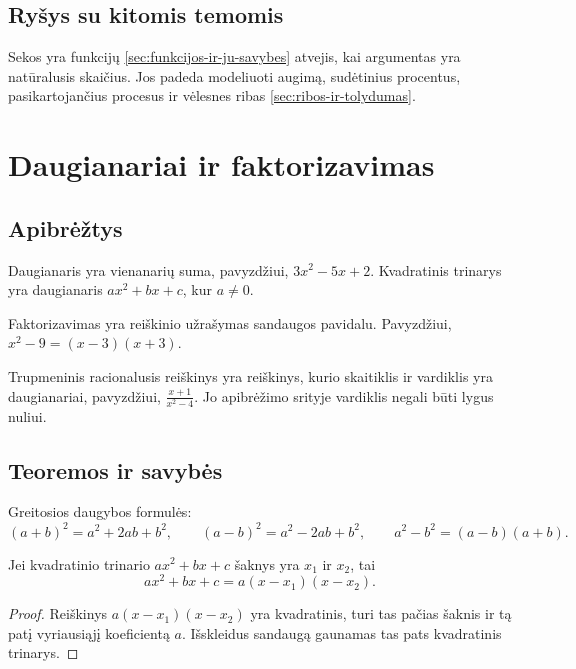\subsection{Ryšys su kitomis temomis}

Sekos yra funkcijų \ref{sec:funkcijos-ir-ju-savybes} atvejis, kai argumentas yra natūralusis skaičius. Jos padeda modeliuoti augimą, sudėtinius procentus, pasikartojančius procesus ir vėlesnes ribas \ref{sec:ribos-ir-tolydumas}.

\section{Daugianariai ir faktorizavimas}\label{sec:daugianariai-ir-faktorizavimas}

\subsection{Apibrėžtys}

\begin{apibreztis}
Daugianaris yra vienanarių suma, pavyzdžiui, $3x^2-5x+2$. Kvadratinis trinarys yra daugianaris $ax^2+bx+c$, kur $a\ne0$.
\end{apibreztis}

\begin{apibreztis}
Faktorizavimas yra reiškinio užrašymas sandaugos pavidalu. Pavyzdžiui, $x^2-9=(x-3)(x+3)$.
\end{apibreztis}

\begin{apibreztis}
Trupmeninis racionalusis reiškinys yra reiškinys, kurio skaitiklis ir vardiklis yra daugianariai, pavyzdžiui, $\frac{x+1}{x^2-4}$. Jo apibrėžimo srityje vardiklis negali būti lygus nuliui.
\end{apibreztis}

\subsection{Teoremos ir savybės}

\begin{savybe}
Greitosios daugybos formulės:
\[
(a+b)^2=a^2+2ab+b^2,\qquad (a-b)^2=a^2-2ab+b^2,\qquad a^2-b^2=(a-b)(a+b).
\]
\end{savybe}

\begin{teorema}
Jei kvadratinio trinario $ax^2+bx+c$ šaknys yra $x_1$ ir $x_2$, tai
\[
ax^2+bx+c=a(x-x_1)(x-x_2).
\]
\end{teorema}
\begin{proof}
Reiškinys $a(x-x_1)(x-x_2)$ yra kvadratinis, turi tas pačias šaknis ir tą patį vyriausiąjį koeficientą $a$. Išskleidus sandaugą gaunamas tas pats kvadratinis trinarys.
\end{proof}


